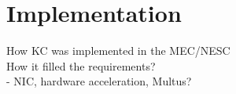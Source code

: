 \chapter{Implementation}
\label{chapter:implementation}

How KC was implemented in the MEC/NESC \\
How it filled the requirements? \\
- NIC, hardware acceleration, Multus? \\

